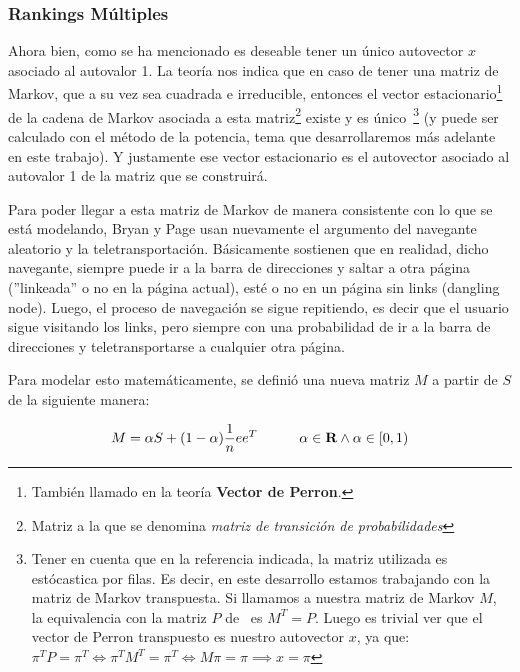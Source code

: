 \subsubsection{Rankings M\'ultiples}
\par Ahora bien, como se ha mencionado es deseable tener un \'unico autovector
$x$ asociado al autovalor 1. La teor\'ia nos indica que en caso de tener una
matriz de Markov, que a su vez sea cuadrada e irreducible, entonces el vector
estacionario\footnote{Tambi\'en llamado en la teor\'ia \textbf{Vector de
Perron}.} de la cadena de Markov asociada a esta matriz\footnote{Matriz a la que
se denomina \emph{matriz de transici\'on de probabilidades}} existe y es
\'unico~\cite[p.693]{Meyer2000}\footnote{Tener en cuenta que en la referencia
indicada, la matriz utilizada es est\'ocastica por filas. Es decir, en este
desarrollo estamos trabajando con la matriz de Markov transpuesta. Si llamamos a
nuestra matriz de Markov $M$, la equivalencia con la matriz $P$
de~\cite[p.693]{Meyer2000} es $M^T = P$. Luego es trivial ver que el vector de
Perron transpuesto es nuestro autovector $x$, ya que: $\pi^TP =\pi^T \iff
\pi^TM^T=\pi^T \iff M\pi=\pi \implies x=\pi$} (y puede ser calculado con el
m\'etodo de la potencia, tema que desarrollaremos m\'as adelante en este
trabajo). Y justamente ese vector estacionario es el autovector asociado al
autovalor 1 de la matriz que se construir\'a.

\par Para poder llegar a esta matriz de Markov de manera consistente con lo
que se est\'a modelando, Bryan y Page usan nuevamente el argumento del navegante
aleatorio y la teletransportaci\'on.  B\'asicamente sostienen que en realidad,
dicho navegante, siempre puede ir a la barra de direcciones y saltar a otra
p\'agina (''linkeada'' o no en la p\'agina actual), est\'e o no en un p\'agina
sin links (dangling node). Luego, el proceso de navegaci\'on se sigue
repitiendo, es decir que el usuario sigue visitando los links, pero siempre con
una probabilidad de ir a la barra de direcciones y teletransportarse a cualquier
otra p\'agina.

\par Para modelar esto matem\'aticamente, se defini\'o una nueva matriz
$M$ a partir de $S$ de la siguiente manera:

\begin{equation}
    M = \alpha S + (1-\alpha) \frac{1}{n}ee^T
    \quad\quad\quad \alpha\in\hbox{\bf R} \land \alpha\in\left[0,1\right)
\end{equation}

